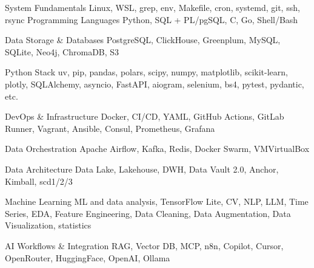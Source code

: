 

\begin{cvskills}

  \cvskill
    {System Fundamentals} %
    {Linux, WSL, grep, env, Makefile, cron, systemd, git, ssh, rsync} %
  \cvskill
    {Programming Languages} %
    {Python, SQL + PL/pgSQL, C, Go, Shell/Bash} %

  \cvskill
    {Data Storage \& Databases} %
    {PostgreSQL, ClickHouse, Greenplum, MySQL, SQLite, Neo4j, ChromaDB, S3} %

  \cvskill
    {Python Stack} %
    {uv, pip, pandas, polars, scipy, numpy, matplotlib, scikit-learn, plotly, SQLAlchemy, asyncio, FastAPI, aiogram, selenium, bs4, pytest, pydantic, etc.} %

  \cvskill
    {DevOps \& Infrastructure} %
    {Docker, CI/CD, YAML, GitHub Actions, GitLab Runner, Vagrant, Ansible, Consul, Prometheus, Grafana} %

  \cvskill
    {Data Orchestration} %
    {Apache Airflow, Kafka, Redis, Docker Swarm, VMVirtualBox} %

  \cvskill
    {Data Architecture} %
    {Data Lake, Lakehouse, DWH, Data Vault 2.0, Anchor, Kimball, scd1/2/3} %

  \cvskill
    {Machine Learning} %
    {ML and data analysis, TensorFlow Lite, CV, NLP, LLM, Time Series, EDA, Feature Engineering, Data Cleaning, Data Augmentation, Data Visualization, statistics} %

  \cvskill
    {AI Workflows \& Integration} %
    {RAG, Vector DB, MCP, n8n, Copilot, Cursor, OpenRouter, HuggingFace, OpenAI, Ollama} %

\end{cvskills}


